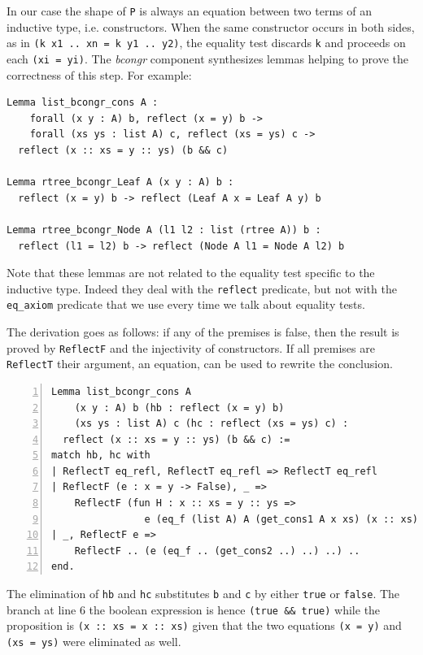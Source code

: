 \documentclass[a4paper,UKenglish,cleveref, autoref]{lipics-v2019}
\newcommand{\derive}[1]{\emph{#1}}
\begin{document}
\noindent
In our case the shape of
\lstinline+P+ is always an equation between two terms of
an inductive type, i.e. constructors.
When the same constructor occurs in both sides, as in
\lstinline+(k x1 .. xn = k y1 .. y2)+, the equality test
discards \lstinline+k+ and proceeds on each \lstinline+(xi = yi)+.
The \derive{bcongr} component synthesizes lemmas
helping to prove the correctness of this step. For example:

\begin{lstlisting}
Lemma list_bcongr_cons A :
    forall (x y : A) b, reflect (x = y) b ->
    forall (xs ys : list A) c, reflect (xs = ys) c ->
  reflect (x :: xs = y :: ys) (b && c)

Lemma rtree_bcongr_Leaf A (x y : A) b :
  reflect (x = y) b -> reflect (Leaf A x = Leaf A y) b

Lemma rtree_bcongr_Node A (l1 l2 : list (rtree A)) b :
  reflect (l1 = l2) b -> reflect (Node A l1 = Node A l2) b
\end{lstlisting}

\noindent
Note that these lemmas are not related to the
equality test specific to the inductive type. Indeed they deal
with the \lstinline+reflect+ predicate, but not with the
\lstinline+eq_axiom+ predicate that we use every time we talk
about equality tests.

The derivation goes as follows: if any of the premises
is false, then the result is proved by
\lstinline+ReflectF+ and the injectivity of constructors.
If all premises are \lstinline+ReflectT+ their argument,
an equation, can be used to rewrite the conclusion.

\begin{lstlisting}[numbers=left]
Lemma list_bcongr_cons A 
    (x y : A) b (hb : reflect (x = y) b)
    (xs ys : list A) c (hc : reflect (xs = ys) c) :
  reflect (x :: xs = y :: ys) (b && c) :=
match hb, hc with
| ReflectT eq_refl, ReflectT eq_refl => ReflectT eq_refl
| ReflectF (e : x = y -> False), _ =>
    ReflectF (fun H : x :: xs = y :: ys =>
                e (eq_f (list A) A (get_cons1 A x xs) (x :: xs) (y :: ys) H))
| _, ReflectF e =>
    ReflectF .. (e (eq_f .. (get_cons2 ..) ..) ..) ..
end.
\end{lstlisting}

\noindent
The elimination of \lstinline+hb+ and \lstinline+hc+
substitutes \lstinline+b+ and \lstinline+c+ 
by either \lstinline+true+ or \lstinline+false+. The branch
at line 6 the boolean expression is hence \lstinline+(true && true)+
while the proposition is \lstinline+(x :: xs = x :: xs)+ given that
the two equations \lstinline+(x = y)+ and \lstinline+(xs = ys)+
were eliminated as well.
\end{document}
